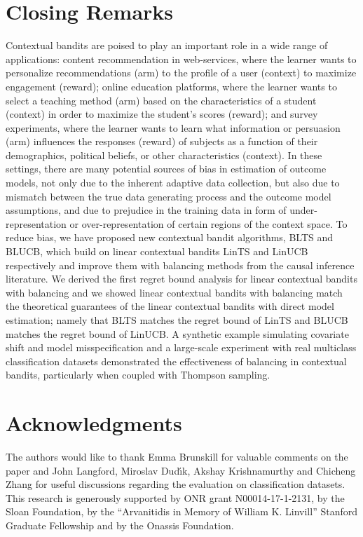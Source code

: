 \documentclass[letterpaper]{article} %
\begin{document}
\vspace{-0.93mm}
\vspace{-1.62mm}
\vspace{-5.14mm}
\section{Closing Remarks}
Contextual bandits are poised to play an important role in a wide range of applications:
content recommendation in web-services, where the learner wants to personalize recommendations (arm) to the profile of a user (context) to maximize engagement (reward);  online education platforms, where the learner wants to select a teaching method (arm) based on the characteristics of a student (context) in order to maximize the student's scores (reward); and survey experiments, where the learner wants to learn what information or persuasion (arm) influences the responses (reward) of subjects as a function of their demographics, political beliefs, or other characteristics (context).
In these settings, there are many potential sources of bias in estimation of outcome models, not only due to the inherent adaptive data collection, but also due to mismatch between the true data generating process and the outcome model assumptions, and due to prejudice in the training data in form of under-representation or over-representation of certain regions of the context space.
To reduce bias, we have proposed new contextual bandit algorithms, BLTS and BLUCB, which build on linear contextual bandits LinTS and LinUCB respectively and improve them with balancing methods from the causal inference literature.  We derived the first regret bound analysis for linear contextual bandits with balancing and we showed linear contextual bandits with balancing match the theoretical guarantees of the linear contextual bandits with direct model estimation; namely that BLTS matches the regret bound of LinTS and BLUCB matches the regret bound of LinUCB.
A synthetic example simulating covariate shift and model misspecification and a large-scale experiment with real multiclass classification datasets demonstrated the effectiveness of balancing in contextual bandits, particularly when coupled with Thompson sampling.


\vspace{-0.81mm}
\vspace{-1.43mm}
\section{Acknowledgments}
The authors would like to thank Emma Brunskill for valuable comments on the paper and John Langford, Miroslav Dud{\'\i}k, Akshay Krishnamurthy and Chicheng Zhang for useful discussions regarding the evaluation on classification datasets.
This research is generously supported by ONR grant N00014-17-1-2131, by the Sloan Foundation, by the ``Arvanitidis in Memory of William K. Linvill'' Stanford Graduate Fellowship and by the Onassis Foundation.
\end{document}
